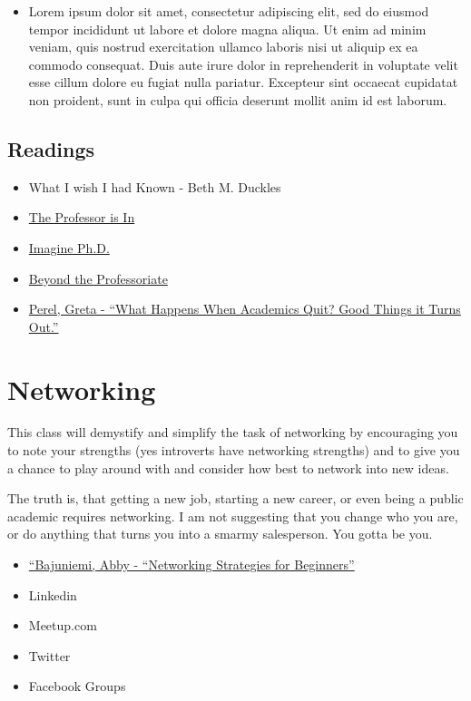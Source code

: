 \documentclass[]{book}
\providecommand{\tightlist}{%
  \setlength{\itemsep}{0pt}\setlength{\parskip}{0pt}}
\begin{document}
\begin{itemize}
\tightlist
\item
  Lorem ipsum dolor sit amet, consectetur adipiscing elit, sed do
  eiusmod tempor incididunt ut labore et dolore magna aliqua. Ut enim ad
  minim veniam, quis nostrud exercitation ullamco laboris nisi ut
  aliquip ex ea commodo consequat. Duis aute irure dolor in
  reprehenderit in voluptate velit esse cillum dolore eu fugiat nulla
  pariatur. Excepteur sint occaecat cupidatat non proident, sunt in
  culpa qui officia deserunt mollit anim id est laborum.
\end{itemize}

\section{Readings}\label{readings-1}

\begin{itemize}
\tightlist
\item
  What I wish I had Known - Beth M. Duckles
\item
  \href{http://theprofessorisin.com/}{The Professor is In}
\item
  \href{https://www.imaginephd.com/}{Imagine Ph.D.}
\item
  \href{https://community.beyondprof.com/}{Beyond the Professoriate}
\item
  \href{https://www.timeshighereducation.com/blog/what-happens-when-academics-quit-good-things-it-turns-out}{Perel,
  Greta - ``What Happens When Academics Quit? Good Things it Turns
  Out.''}
\end{itemize}

\chapter{Networking}\label{networking}

This class will demystify and simplify the task of networking by
encouraging you to note your strengths (yes introverts have networking
strengths) and to give you a chance to play around with and consider how
best to network into new ideas.

The truth is, that getting a new job, starting a new career, or even
being a public academic requires networking. I am not suggesting that
you change who you are, or do anything that turns you into a smarmy
salesperson. You gotta be you.

\begin{itemize}
\tightlist
\item
  \href{https://code.likeagirl.io/networking-strategies-for-beginners-986fe0b3efdf}{``Bajuniemi,
  Abby - ``Networking Strategies for Beginners''}
\item
  Linkedin
\item
  Meetup.com
\item
  Twitter
\item
  Facebook Groups
\end{itemize}
\end{document}
